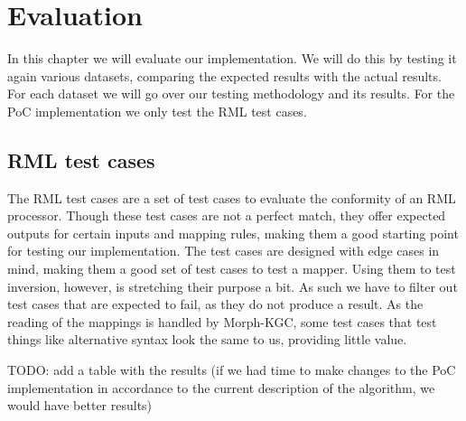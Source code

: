 \chapter{Evaluation}
\label{chapter:evaluation}
In this chapter we will evaluate our implementation. We will do this by testing it again various datasets, comparing the expected results with the actual results. For each dataset we will go over our testing methodology and its results. For the PoC implementation we only test the RML test cases.

\section{RML test cases}
\label{section:rml_test_cases}
The RML test cases are a set of test cases to evaluate the conformity of an RML processor. Though these test cases are not a perfect match, they offer expected outputs for certain inputs and mapping rules, making them a good starting point for testing our implementation. The test cases are designed with edge cases in mind, making them a good set of test cases to test a mapper. Using them to test inversion, however, is stretching their purpose a bit. As such we have to filter out test cases that are expected to fail, as they do not produce a result. As the reading of the mappings is handled by Morph-KGC, some test cases that test things like alternative syntax look the same to us, providing little value.

TODO: add a table with the results
(if we had time to make changes to the PoC implementation in accordance to the current description of the algorithm, we would have better results)